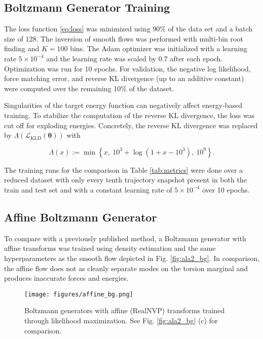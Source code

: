 \documentclass{article}
\begin{document}
\subsection{Boltzmann Generator Training}
\label{sec:ala2training}
The loss function \eqref{eq:loss} was minimized using 90\% of the data set and a batch size of 128. The inversion of smooth flows was performed with multi-bin root finding and $K=100$ bins. The Adam optimizer \cite{kingma2014adam} was initialized with a learning rate $5\times 10^{-4}$ and the learning rate was scaled by $0.7$ after each epoch. Optimization was run for 10 epochs. For validation, the negative log likelihood, force matching error, and reverse KL divergence (up to an additive constant) were computed over the remaining 10\% of the dataset. 

Singularities of the target energy function can negatively affect energy-based training. To stabilize the computation of the reverse KL divergence, the loss was cut off for exploding energies. Concretely, the reverse KL divergence was replaced by $\Lambda \left(\mathcal{L}_{\mathrm{KLD}}(\bm{\theta}) \right)$ with

\begin{equation*}
\Lambda(x) := \min \left\{ 
     x, \ 
     10^3 + \log(1 + x - 10^3), \ 
     10^9
\right\}.
\end{equation*}

The training runs for the comparison in Table \ref{tab:metrics} were done over a reduced dataset with only every tenth trajectory snapshot present in both the train and test set and with a constant learning rate of $5\times10^{-4}$ over 10 epochs.




\subsection{Affine Boltzmann Generator}
To compare with a previously published method, a Boltzmann generator with affine transforms was trained using density estimation and the same hyperparameters as the smooth flow depicted in Fig. \ref{fig:ala2_bg}. In comparison, the affine flow does not as cleanly separate modes on the torsion marginal and produces inaccurate forces and energies.


\begin{figure}
    \centering
    \texttt{[image: figures/affine\_bg.png]}
    \caption{Boltzmann generators with affine (RealNVP) transforms trained through likelihood maximization. See Fig. \ref{fig:ala2_bg} (c) for comparison.} 
    \label{fig:affine_bg}
\end{figure}
\end{document}
